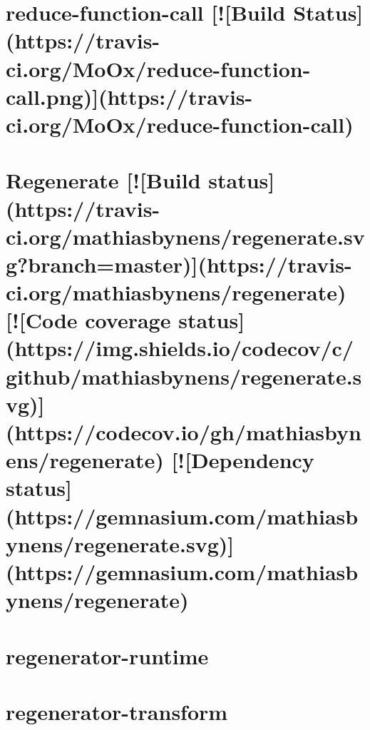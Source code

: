 \documentclass[twoside]{book}
\newcommand{\+}{\discretionary{\mbox{\scriptsize$\hookleftarrow$}}{}{}}
\begin{document}
\chapter{reduce-\/function-\/call \mbox{[}!\mbox{[}Build Status\mbox{]}(https\+://travis-\/ci.org/\+Mo\+Ox/reduce-\/function-\/call.png)\mbox{]}(https\+://travis-\/ci.org/\+Mo\+Ox/reduce-\/function-\/call)}
\label{md__c_1_workspace_demo_src_main_script_node_modules_reduce-function-call__r_e_a_d_m_e}

\chapter{Regenerate \mbox{[}!\mbox{[}Build status\mbox{]}(https\+://travis-\/ci.org/mathiasbynens/regenerate.svg?branch=master)\mbox{]}(https\+://travis-\/ci.org/mathiasbynens/regenerate) \mbox{[}!\mbox{[}Code coverage status\mbox{]}(https\+://img.shields.\+io/codecov/c/github/mathiasbynens/regenerate.svg)\mbox{]}(https\+://codecov.io/gh/mathiasbynens/regenerate) \mbox{[}!\mbox{[}Dependency status\mbox{]}(https\+://gemnasium.com/mathiasbynens/regenerate.svg)\mbox{]}(https\+://gemnasium.com/mathiasbynens/regenerate)}
\label{md__c_1_workspace_demo_src_main_script_node_modules_regenerate__r_e_a_d_m_e}

\chapter{regenerator-\/runtime}
\label{md__c_1_workspace_demo_src_main_script_node_modules_regenerator-runtime__r_e_a_d_m_e}

\chapter{regenerator-\/transform}
\label{md__c_1_workspace_demo_src_main_script_node_modules_regenerator-transform__r_e_a_d_m_e}

\end{document}
